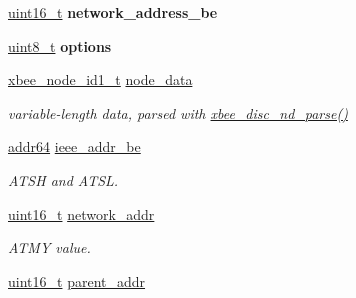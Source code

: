 \begin{DoxyCompactItemize}
\mbox{\label{group__xbee__discovery_ga73d48563eb05cd5fcc4add79d226a3b8}} 
\hyperlink{group__hal__dos_ga5a8b2dc9e45a9ee81a94ef304fb62505}{uint16\+\_\+t} {\bfseries network\+\_\+address\+\_\+be}
\item 
\mbox{\label{group__xbee__discovery_gaace3d640c8d449b8db1162993d259d3f}} 
\hyperlink{group__hal__dos_gae1affc9ca37cfb624959c866a73f83c2}{uint8\+\_\+t} {\bfseries options}
\item 
\mbox{\label{group__xbee__discovery_ga85b75c5bbcd6d39fb6e2802f35f926ff}} 
\hyperlink{group__xbee__discovery_gaf00a7a98eff47e084bf5f8741bf41220}{xbee\+\_\+node\+\_\+id1\+\_\+t} \hyperlink{group__xbee__discovery_ga85b75c5bbcd6d39fb6e2802f35f926ff}{node\+\_\+data}
\begin{DoxyCompactList}\small\item\em variable-\/length data, parsed with \hyperlink{group__xbee__discovery_ga1efd48449a49119fc19ab9843af5ef6c}{xbee\+\_\+disc\+\_\+nd\+\_\+parse()} \end{DoxyCompactList}\item 
\mbox{\label{group__xbee__discovery_ga719f89263ecae9f127dc655c1c14fdac}} 
\hyperlink{unionaddr64}{addr64} \hyperlink{group__xbee__discovery_ga719f89263ecae9f127dc655c1c14fdac}{ieee\+\_\+addr\+\_\+be}
\begin{DoxyCompactList}\small\item\em A\+T\+SH and A\+T\+SL. \end{DoxyCompactList}\item 
\mbox{\label{group__xbee__discovery_gac1fa8be8752da585fe6a567d4732c147}} 
\hyperlink{group__hal__dos_ga5a8b2dc9e45a9ee81a94ef304fb62505}{uint16\+\_\+t} \hyperlink{group__xbee__discovery_gac1fa8be8752da585fe6a567d4732c147}{network\+\_\+addr}
\begin{DoxyCompactList}\small\item\em A\+T\+MY value. \end{DoxyCompactList}\item 
\mbox{\label{group__xbee__discovery_ga300e014f0c31d08adc1145613e0b0f72}} 
\hyperlink{group__hal__dos_ga5a8b2dc9e45a9ee81a94ef304fb62505}{uint16\+\_\+t} \hyperlink{group__xbee__discovery_ga300e014f0c31d08adc1145613e0b0f72}{parent\+\_\+addr}

\end{DoxyCompactItemize}
